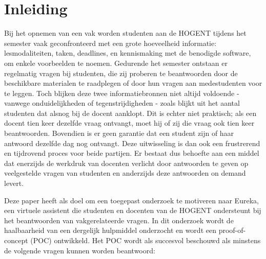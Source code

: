 


% 

\section{Inleiding}%
\label{sec:inleiding}

Bij het opnemen van een vak worden studenten aan de HOGENT tijdens het semester vaak geconfronteerd met een grote hoeveelheid informatie: lesmodaliteiten, taken, deadlines, en kennismaking met de benodigde software, om enkele voorbeelden te noemen. Gedurende het semester ontstaan er regelmatig vragen bij studenten, die zij proberen te beantwoorden door de beschikbare materialen te raadplegen of door hun vragen aan medestudenten voor te leggen. Toch blijken deze twee informatiebronnen niet altijd voldoende - vanwege onduidelijkheden of tegenstrijdigheden - zoals blijkt uit het aantal studenten dat alsnog bij de docent aanklopt. Dit is echter niet praktisch; als een docent tien keer dezelfde vraag ontvangt, moet hij of zij die vraag ook tien keer beantwoorden. Bovendien is er geen garantie dat een student zijn of haar antwoord dezelfde dag nog ontvangt. Deze uitwisseling is dan ook een frustrerend en tijdrovend proces voor beide partijen. Er bestaat dus behoefte aan een middel dat enerzijds de werkdruk van docenten verlicht door antwoorden te geven op veelgestelde vragen van studenten en anderzijds deze antwoorden on demand levert.

Deze paper heeft als doel om een toegepast onderzoek te motiveren naar Eureka, een virtuele assistent die studenten en docenten van de HOGENT ondersteunt bij het beantwoorden van vakgerelateerde vragen. In dit onderzoek wordt de haalbaarheid van een dergelijk hulpmiddel onderzocht en wordt een proof-of-concept (POC) ontwikkeld. Het POC wordt als succesvol beschouwd als minstens de volgende vragen kunnen worden beantwoord:

